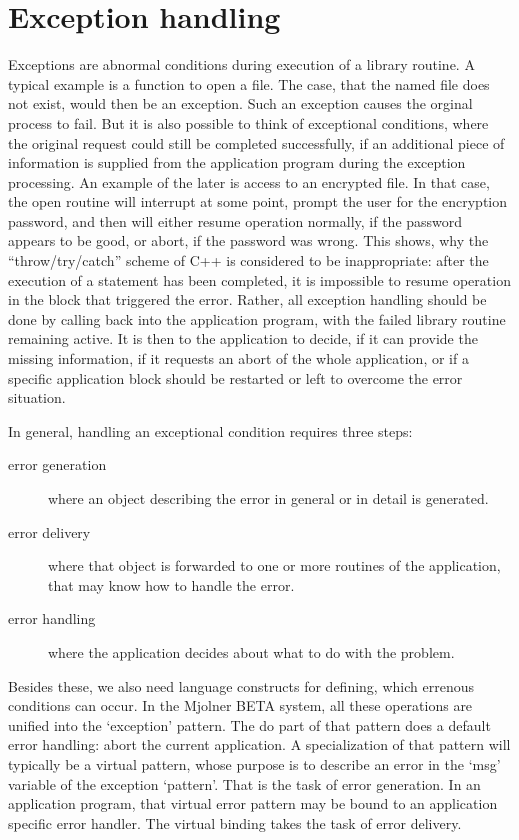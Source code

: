 \section{Exception handling}
Exceptions are abnormal conditions during execution of a library
routine.  A typical example is a function to open a file.  The
case, that the named file does not exist, would then be an
exception.  Such an exception causes the orginal process to fail.
But it is also possible to think of exceptional conditions, where
the original request could still be completed successfully, if an
additional piece of information is supplied from the application
program during the exception processing.  An example of the later
is access to an encrypted file.  In that case, the open routine
will interrupt at some point, prompt the user for the encryption
password, and then will either resume operation normally, if the
password appears to be good, or abort, if the password was wrong.
This shows, why the "`throw/try/catch"' scheme of C++ is
considered to be inappropriate: after the execution of a
 statement has been completed, it is impossible to
resume operation in the block that triggered the error.  Rather,
all exception handling should be done by calling back into the
application program, with the failed library routine remaining
active.  It is then to the application to decide, if it can
provide the missing information, if it requests an abort of the
whole application, or if a specific application block should be
restarted or left to overcome the error situation.

In general, handling an exceptional condition requires three
steps:
\begin{description}
\item[error generation] where an object describing the error
    in general or in detail is generated.
\item[error delivery] where that object is forwarded to one or
    more routines of the application, that may know how to
    handle the error.
\item[error handling] where the application decides about what
    to do with the problem.
\end{description}
Besides these, we also need language constructs for defining,
which errenous conditions can occur.  In the Mjolner BETA system,
all these operations are unified into the `exception' pattern.
The do part of that pattern does a default error handling: abort
the current application.  A specialization of that pattern will
typically be a virtual pattern, whose purpose is to describe an
error in the `msg' variable of the exception `pattern'.  That is
the task of error generation.  In an application program, that
virtual error pattern may be bound to an application specific
error handler.  The virtual binding takes the task of error
delivery.

